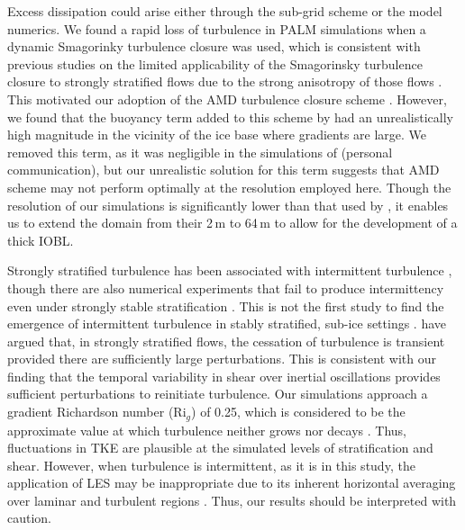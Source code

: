 \documentclass[tc, manuscript]{copernicus}
\begin{document}
Excess dissipation could arise either through the sub-grid scheme or the model numerics. We found a rapid loss of turbulence in PALM simulations when a dynamic Smagorinky turbulence closure was used, which is consistent with previous studies on the limited applicability of the Smagorinsky turbulence closure to strongly stratified flows due to the strong anisotropy of those flows \citep{flores_analysis_2011, jimenez_large-eddy_2005}. This motivated our adoption of the AMD turbulence closure scheme \citep{abkar_minimum-dissipation_2016}. However, we found that the buoyancy term added to this scheme by \citet{abkar_large-eddy_2017} had an unrealistically high magnitude in the vicinity of the ice base where gradients are large. We removed this term, as it was negligible in the simulations of \citet{vreugdenhil_stratification_2019} (personal communication), but our unrealistic solution for this term suggests that AMD scheme may not perform optimally at the resolution employed here. Though the resolution of our simulations is significantly lower than that used by \citet{vreugdenhil_stratification_2019}, it enables us to extend the domain from their 2\,\unit{m} to 64\,\unit{m} to allow for the development of a thick IOBL. 

Strongly stratified turbulence has been associated with intermittent turbulence \citep{nieuwstadt_direct_2005, wiel_cessation_2012}, though there are also numerical experiments that fail to produce intermittency even under strongly stable stratification \citep{arya_buoyancy_1975, komori_turbulence_1983}. This is not the first study to find the emergence of intermittent turbulence in stably stratified, sub-ice settings \citep{vreugdenhil_stratification_2019}. \citet{donda_collapse_2015} have argued that, in strongly stratified flows, the cessation of turbulence is transient provided there are sufficiently large perturbations. This is consistent with our finding that the temporal variability in shear over inertial oscillations provides sufficient perturbations to reinitiate turbulence. Our simulations approach a gradient Richardson number ($\text{Ri}_g$) of 0.25, which is considered to be the approximate value at which turbulence neither grows nor decays \citep{holt_numerical_1992, rohr_growth_1988}. Thus, fluctuations in TKE are plausible at the simulated levels of stratification and shear. However, when turbulence is intermittent, as it is in this study, the application of LES may be inappropriate due to its inherent horizontal averaging over laminar and turbulent regions \citep{stoll_large-eddy_2008}. Thus, our results should be interpreted with caution. 
\end{document}
